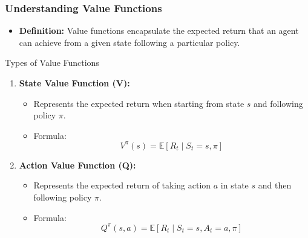 \documentclass{beamer}
\begin{document}
\begin{frame}[fragile]
    \frametitle{Understanding Value Functions}
    \begin{itemize}
        \item \textbf{Definition:} Value functions encapsulate the expected return that an agent can achieve from a given state following a particular policy.
    \end{itemize}
    \begin{block}{Types of Value Functions}
        \begin{enumerate}
            \item \textbf{State Value Function (V):} 
                \begin{itemize}
                    \item Represents the expected return when starting from state $s$ and following policy $\pi$.
                    \item Formula: 
                    \[
                    V^\pi(s) = \mathbb{E}[R_t \mid S_t = s, \pi]
                    \]
                \end{itemize}
            \item \textbf{Action Value Function (Q):} 
                \begin{itemize}
                    \item Represents the expected return of taking action $a$ in state $s$ and then following policy $\pi$.
                    \item Formula:
                    \[
                    Q^\pi(s, a) = \mathbb{E}[R_t \mid S_t = s, A_t = a, \pi]
                    \]
                \end{itemize}
        \end{enumerate}
    \end{block}
\end{frame}
\end{document}
